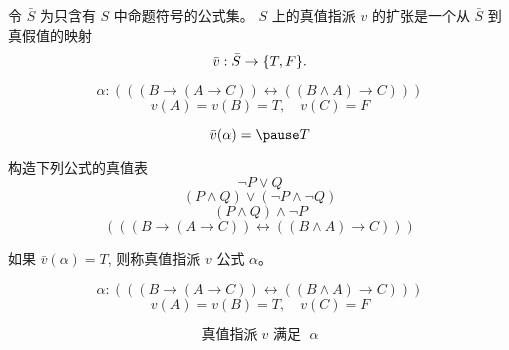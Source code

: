 \begin{frame}{}
  \begin{definition}
    令 $\bar{S}$ 为只含有 $S$ 中命题符号的公式集。
    $S$ 上的真值指派 $v$ 的扩张是一个从 $\bar{S}$ 到真假值的映射
    \[
      \bar{v}: \bar{S} \to \{T, F\}.
    \]
  \end{definition}

  \pause
  \[
    \alpha: (((B \to (A \to C)) \leftrightarrow ((B \land A) \to C)))
  \]
  \[
    v(A) = v(B) = T, \quad v(C) = F
  \]

  \pause
  \[
    \bar{v}(\alpha) = \pause T
  \]
\end{frame}

\begin{frame}{}
  \begin{exampleblock}{构造下列公式的真值表}
    \[
      \lnot P \lor Q
    \]
    \[
      (P \land Q) \lor (\lnot P \land \lnot Q)
    \]
    \[
      (P \land Q) \land \lnot P
    \]
    \[
      (((B \to (A \to C)) \leftrightarrow ((B \land A) \to C)))
    \]
  \end{exampleblock}
\end{frame}

\begin{frame}{}
  \begin{definition}[满足 (Satisfy)]
    如果 $\bar{v}(\alpha) = T$, 则称真值指派 $v$ 公式 $\alpha$。
  \end{definition}

  \pause
  \[
    \alpha: (((B \to (A \to C)) \leftrightarrow ((B \land A) \to C)))
  \]
  \[
    v(A) = v(B) = T, \quad v(C) = F
  \]

  \[
    \text{真值指派}\; v \text{ 满足 }\; \alpha
  \]
\end{frame}

\begin{frame}{}
  \begin{definition}
  \end{definition}

  \pause
  \vspace{0.60cm}
  \begin{definition}
  \end{definition}
\end{frame}

